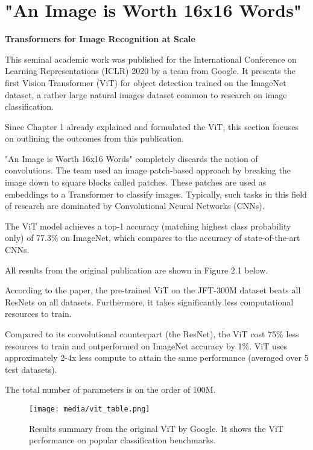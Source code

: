\section{"An Image is Worth 16x16 Words"}

\textbf{Transformers for Image Recognition at Scale}


This seminal academic work was published for the International Conference on 
Learning Representations (ICLR) 2020 by a team from Google.
It presents the first Vision Transformer (ViT) for object detection
trained on the ImageNet dataset, a rather large natural images dataset common to research on 
image classification.


Since Chapter 1 already explained and formulated the ViT, this section focuses
on outlining the outcomes from this publication.

"An Image is Worth 16x16 Words" completely discards the notion of convolutions. 
The team used an image patch-based approach by breaking the image down to square blocks called patches.
These patches are used as embeddings to a Transformer to classify images.
Typically, such tasks in this field of research are dominated by Convolutional Neural Networks (CNNs).

The ViT model achieves a top-1 accuracy (matching highest class probability only) of 77.3\% on ImageNet, which 
compares to the accuracy of state-of-the-art CNNs.

All results from the original publication are shown in Figure 2.1 below.


According to the paper, the pre-trained ViT on the JFT-300M dataset beats all ResNets on all
datasets. Furthermore, it takes significantly less computational resources to train. \citep{dosovitskiy2020vit}

Compared to its convolutional counterpart (the ResNet), the ViT cost 75\% 
less resources to train and outperformed on ImageNet accuracy by 1\%. 
ViT uses approximately 2-4x less compute to attain the same performance 
(averaged over 5 test datasets). 

The total number of parameters is on the order of 100M.

\begin{figure}[H]
	\begin{center}
	\texttt{[image: media/vit\_table.png]}
	\end{center}
	\caption[Original ViT Results]{Results summary from the original ViT by Google. It shows 
    the ViT performance on popular classification benchmarks. \citep{dosovitskiy2020vit}}
	\end{figure}

